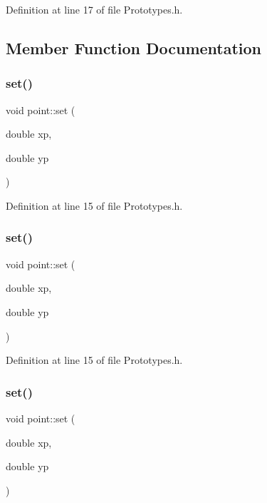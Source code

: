 Definition at line 17 of file Prototypes.\+h.



\subsection{Member Function Documentation}
\mbox{\label{classpoint_a55ff7a33caa2783f318bc5f65746e32e}} 
\subsubsection{\texorpdfstring{set()}{set()}\hspace{0.1cm}{\footnotesize\ttfamily [1/3]}}
{\footnotesize\ttfamily void point\+::set (\begin{DoxyParamCaption}\item[{double}]{xp,  }\item[{double}]{yp }\end{DoxyParamCaption})\hspace{0.3cm}{\ttfamily [inline]}}



Definition at line 15 of file Prototypes.\+h.

\mbox{\label{classpoint_a55ff7a33caa2783f318bc5f65746e32e}} 
\subsubsection{\texorpdfstring{set()}{set()}\hspace{0.1cm}{\footnotesize\ttfamily [2/3]}}
{\footnotesize\ttfamily void point\+::set (\begin{DoxyParamCaption}\item[{double}]{xp,  }\item[{double}]{yp }\end{DoxyParamCaption})\hspace{0.3cm}{\ttfamily [inline]}}



Definition at line 15 of file Prototypes.\+h.

\mbox{\label{classpoint_a55ff7a33caa2783f318bc5f65746e32e}} 
\subsubsection{\texorpdfstring{set()}{set()}\hspace{0.1cm}{\footnotesize\ttfamily [3/3]}}
{\footnotesize\ttfamily void point\+::set (\begin{DoxyParamCaption}\item[{double}]{xp,  }\item[{double}]{yp }\end{DoxyParamCaption})\hspace{0.3cm}{\ttfamily [inline]}}



